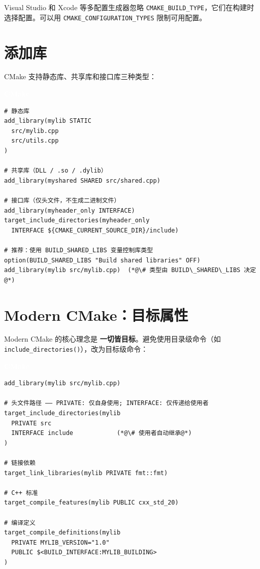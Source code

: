 \documentclass[12pt,a4paper,fontset=fandol]{ctexbook}
\newcommand{\Fn}[1]{\texttt{#1()}}
\newcommand{\Tp}[1]{\texttt{#1}}
\newcommand{\cmakelabel}{%
  \noindent\begin{tcolorbox}[sharp corners,colback=cmakeheadbg,colframe=cmakeheadbg,
    left=6pt,right=6pt,top=2pt,bottom=2pt,boxrule=0pt]
  \textcolor{white}{\small\bfseries\sffamily CMake}\end{tcolorbox}%
}
\begin{document}
\begin{note}
Visual Studio 和 Xcode 等多配置生成器忽略 \Tp{CMAKE\_BUILD\_TYPE}，它们在构建时选择配置。可以用 \Tp{CMAKE\_CONFIGURATION\_TYPES} 限制可用配置。
\end{note}

\section{添加库}

CMake 支持静态库、共享库和接口库三种类型：

\cmakelabel
\begin{lstlisting}[style=cmakestyle]
# 静态库
add_library(mylib STATIC
  src/mylib.cpp
  src/utils.cpp
)

# 共享库（DLL / .so / .dylib）
add_library(myshared SHARED src/shared.cpp)

# 接口库（仅头文件，不生成二进制文件）
add_library(myheader_only INTERFACE)
target_include_directories(myheader_only
  INTERFACE ${CMAKE_CURRENT_SOURCE_DIR}/include)

# 推荐：使用 BUILD_SHARED_LIBS 变量控制库类型
option(BUILD_SHARED_LIBS "Build shared libraries" OFF)
add_library(mylib src/mylib.cpp)  (*@\# 类型由 BUILD\_SHARED\_LIBS 决定@*)
\end{lstlisting}

\section{Modern CMake：目标属性}

{\sloppy Modern CMake 的核心理念是 \textbf{一切皆目标}。避免使用目录级命令（如 \Fn{include\_\allowbreak{}directories}），改为目标级命令：\par}

\cmakelabel
\begin{lstlisting}[style=cmakestyle]
add_library(mylib src/mylib.cpp)

# 头文件路径 —— PRIVATE: 仅自身使用; INTERFACE: 仅传递给使用者
target_include_directories(mylib
  PRIVATE src
  INTERFACE include            (*@\# 使用者自动继承@*)
)

# 链接依赖
target_link_libraries(mylib PRIVATE fmt::fmt)

# C++ 标准
target_compile_features(mylib PUBLIC cxx_std_20)

# 编译定义
target_compile_definitions(mylib
  PRIVATE MYLIB_VERSION="1.0"
  PUBLIC $<BUILD_INTERFACE:MYLIB_BUILDING>
)
\end{lstlisting}
\end{document}
